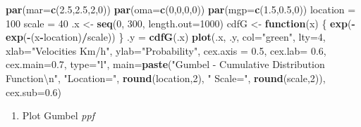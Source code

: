 \documentclass[12pt,oneside]{reedthesis}
\newenvironment{Shaded}{\begin{snugshade}}{\end{snugshade}}
\newcommand{\CharTok}[1]{\textcolor[rgb]{0.31,0.60,0.02}{#1}}
\newcommand{\ControlFlowTok}[1]{\textcolor[rgb]{0.13,0.29,0.53}{\textbf{#1}}}
\newcommand{\DataTypeTok}[1]{\textcolor[rgb]{0.13,0.29,0.53}{#1}}
\newcommand{\DecValTok}[1]{\textcolor[rgb]{0.00,0.00,0.81}{#1}}
\newcommand{\FloatTok}[1]{\textcolor[rgb]{0.00,0.00,0.81}{#1}}
\newcommand{\KeywordTok}[1]{\textcolor[rgb]{0.13,0.29,0.53}{\textbf{#1}}}
\newcommand{\NormalTok}[1]{#1}
\newcommand{\OperatorTok}[1]{\textcolor[rgb]{0.81,0.36,0.00}{\textbf{#1}}}
\newcommand{\StringTok}[1]{\textcolor[rgb]{0.31,0.60,0.02}{#1}}
\providecommand{\tightlist}{%
  \setlength{\itemsep}{0pt}\setlength{\parskip}{0pt}}
\begin{document}
\begin{Shaded}
\begin{Highlighting}[]
\KeywordTok{par}\NormalTok{(}\DataTypeTok{mar=}\KeywordTok{c}\NormalTok{(}\FloatTok{2.5}\NormalTok{,}\FloatTok{2.5}\NormalTok{,}\DecValTok{2}\NormalTok{,}\DecValTok{0}\NormalTok{))}
\KeywordTok{par}\NormalTok{(}\DataTypeTok{oma=}\KeywordTok{c}\NormalTok{(}\DecValTok{0}\NormalTok{,}\DecValTok{0}\NormalTok{,}\DecValTok{0}\NormalTok{,}\DecValTok{0}\NormalTok{))}
\KeywordTok{par}\NormalTok{(}\DataTypeTok{mgp=}\KeywordTok{c}\NormalTok{(}\FloatTok{1.5}\NormalTok{,}\FloatTok{0.5}\NormalTok{,}\DecValTok{0}\NormalTok{))}
\NormalTok{location =}\StringTok{ }\DecValTok{100}
\NormalTok{scale =}\StringTok{ }\DecValTok{40}
\NormalTok{.x <-}\StringTok{ }\KeywordTok{seq}\NormalTok{(}\DecValTok{0}\NormalTok{, }\DecValTok{300}\NormalTok{, }\DataTypeTok{length.out=}\DecValTok{1000}\NormalTok{)}
\NormalTok{cdfG <-}\StringTok{ }\ControlFlowTok{function}\NormalTok{(x) \{}
  \KeywordTok{exp}\NormalTok{(}\OperatorTok{-}\KeywordTok{exp}\NormalTok{(}\OperatorTok{-}\NormalTok{(x}\OperatorTok{-}\NormalTok{location)}\OperatorTok{/}\NormalTok{scale))}
\NormalTok{  \}}
\NormalTok{.y =}\StringTok{ }\KeywordTok{cdfG}\NormalTok{(.x)}
\KeywordTok{plot}\NormalTok{(.x, .y, }\DataTypeTok{col=}\StringTok{"green"}\NormalTok{, }\DataTypeTok{lty=}\DecValTok{4}\NormalTok{, }\DataTypeTok{xlab=}\StringTok{"Velocities Km/h"}\NormalTok{, }\DataTypeTok{ylab=}\StringTok{"Probability"}\NormalTok{, }\DataTypeTok{cex.axis =} \FloatTok{0.5}\NormalTok{, }\DataTypeTok{cex.lab=} \FloatTok{0.6}\NormalTok{, }\DataTypeTok{cex.main=}\FloatTok{0.7}\NormalTok{, }\DataTypeTok{type=}\StringTok{"l"}\NormalTok{,}
 \DataTypeTok{main=}\KeywordTok{paste}\NormalTok{(}\StringTok{"Gumbel - Cumulative Distribution Function}\CharTok{\textbackslash{}n}\StringTok{"}\NormalTok{, }\StringTok{"Location="}\NormalTok{, }\KeywordTok{round}\NormalTok{(location,}\DecValTok{2}\NormalTok{), }\StringTok{" Scale="}\NormalTok{, }\KeywordTok{round}\NormalTok{(scale,}\DecValTok{2}\NormalTok{)), }\DataTypeTok{cex.sub=}\FloatTok{0.6}\NormalTok{)}
\end{Highlighting}
\end{Shaded}
\normalsize
\begin{enumerate}
\def\labelenumi{\arabic{enumi}.}
\setcounter{enumi}{3}
\tightlist
\item
  Plot Gumbel \emph{ppf}
\end{enumerate}
\tiny
\end{document}

